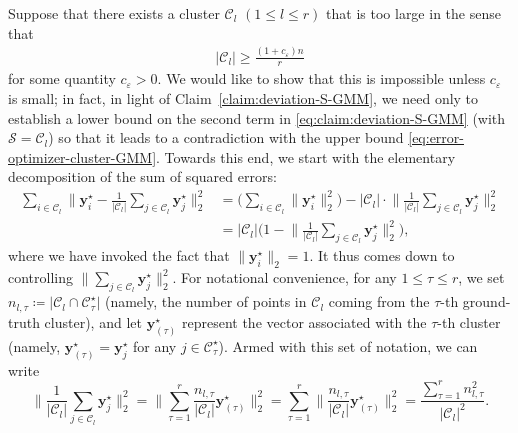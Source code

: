 \bigskip
{}
Suppose that there exists a cluster $\mathcal{C}_{l}$ $(1\leq l\leq r)$ that is too large in the sense that
%
\begin{align}
	\label{eq:Cl-lower-bound-contradition-GMM}
	|\mathcal{C}_{l}|\geq\frac{(1+c_{\varepsilon})n}{r}
\end{align}
%
for some quantity $c_{\varepsilon}>0$. We would like to show that this is impossible unless $c_{\varepsilon}$ is  small;
in fact,  in light of Claim~\ref{claim:deviation-S-GMM},
we need only to establish a lower bound on the second term in \eqref{eq:claim:deviation-S-GMM} (with $\mathcal{S}=\mathcal{C}_{l}$)
so that it leads to a contradiction with the upper bound \eqref{eq:error-optimizer-cluster-GMM}.
Towards this end, we start with the elementary decomposition of the sum of squared errors:
%
\begin{align}
\sum_{i\in\mathcal{C}_{l}}\Big\|\bm{y}_{i}^{\star}-\frac{1}{|\mathcal{C}_{l}|}\sum_{j\in\mathcal{C}_{l}}\bm{y}_{j}^{\star}\Big\|_{2}^{2} & =\Bigg(\sum_{i\in\mathcal{C}_{l}}\big\|\bm{y}_{i}^{\star}\big\|_{2}^{2}\Bigg)-|\mathcal{C}_{l}|\cdot\Big\|\frac{1}{|\mathcal{C}_{l}|}\sum_{j\in\mathcal{C}_{l}}\bm{y}_{j}^{\star}\Big\|_{2}^{2}\nonumber \\
 & =|\mathcal{C}_{l}| \Big(1-\Big\|\frac{1}{|\mathcal{C}_{l}|}\sum_{j\in\mathcal{C}_{l}}\bm{y}_{j}^{\star}\Big\|_{2}^{2}\Big),\label{eq:fitting-error-cluster-GMM-123}
\end{align}
%
where we have invoked the fact that $\big\|\bm{y}_{i}^{\star}\big\|_{2}=1$.
It thus comes down to controlling $\big\|\sum_{j\in\mathcal{C}_{l}}\bm{y}_{j}^{\star}\big\|_{2}^{2}$.
For notational convenience, for any $1\leq\tau\leq r$, we set $n_{l,\tau} \coloneqq \big|\mathcal{C}_{l}\cap\mathcal{C}_{\tau}^{\star}\big|$
(namely, the number of points in $\mathcal{C}_{l}$ coming from the $\tau$-th ground-truth cluster),
and let $\bm{y}_{(\tau)}^{\star}$ represent the vector associated with the $\tau$-th cluster
(namely, $\bm{y}_{(\tau)}^{\star}=\bm{y}_{j}^{\star}$ for any $j\in\mathcal{C}_{\tau}^{\star}$).
Armed with this set of notation, we can write
%
\begin{equation}
\Big\|\frac{1}{|\mathcal{C}_{l}|}\sum_{j\in\mathcal{C}_{l}}\bm{y}_{j}^{\star}\Big\|_{2}^{2}
= \Big\|\sum_{\tau=1}^{r}\frac{n_{l,\tau}}{|\mathcal{C}_{l}|}\bm{y}_{(\tau)}^{\star}\Big\|_{2}^{2}
= \sum_{\tau=1}^{r}\Big\|\frac{n_{l,\tau}}{|\mathcal{C}_{l}|}\bm{y}_{(\tau)}^{\star}\Big\|_{2}^{2}
=\frac{\sum_{\tau=1}^{r}n_{l,\tau}^{2}}{|\mathcal{C}_{l}|^{2}} .
\label{eq:mean-yjstar-decompose-456-GMM}
\end{equation}
